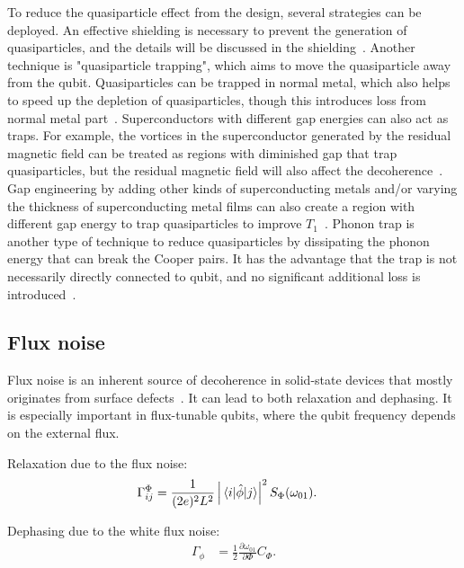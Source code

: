 \documentclass[a4paper,onecolumn,11pt,unpublished]{quantumarticle}
\newcommand{\melabs}[3]{\left|\mel{#1}{#2}{#3}\right|}
\begin{document}
To reduce the quasiparticle effect from the design, several strategies can be deployed. An effective shielding is necessary to prevent the generation of quasiparticles, and the details will be discussed in the shielding~. Another technique is "quasiparticle trapping", which aims to move the quasiparticle away from the qubit. Quasiparticles can be trapped in normal metal, which also helps to speed up the depletion of quasiparticles, though this introduces loss from normal metal part~\cite{Riwar2016Normalmetal}. Superconductors with different gap energies can also act as traps. For example, the vortices in the superconductor generated by the residual magnetic field can be treated as regions with diminished gap that trap quasiparticles, but the residual magnetic field will also affect the decoherence~\cite{Wang2014Measurement}. Gap engineering by adding other kinds of superconducting metals and/or varying the thickness of superconducting metal films can also create a region with different gap energy to trap quasiparticles to improve $T_1$~\cite{Riwar2019Efficient,Pan2022Engineering}. Phonon trap is another type of technique to reduce quasiparticles by dissipating the phonon energy that can break the Cooper pairs. It has the advantage that the trap is not necessarily directly connected to qubit, and no significant additional loss is introduced~\cite{Patel2017Phononmediated,Bargerbos2023Mitigation,Martinis2021Saving,Henriques2019Phonon,deVisser2021PhononTrappingEnhanced}.

\subsection{Flux noise}
Flux noise is an inherent source of decoherence in solid-state devices that mostly originates from surface defects~\cite{Yoshihara2006Decoherence,Koch2007Model,Galperin2007NonGaussian,Kakuyanagi2007Dephasing,Quintana2017Observation,Kumar2016Origin,Wang2018Hydrogen}. It can lead to both relaxation and dephasing. It is especially important in flux-tunable qubits, where the qubit frequency depends on the external flux.  

Relaxation due to the flux noise:~\cite{Nguyen2019HighCoherence,Sun2023Characterization}
\begin{align}
  \Gamma_{ij}^{\Phi} &= \frac{1}{(2e)^2L^2}\melabs{i}{\hat{\phi}}{j}^2S_{\Phi}(\omega_{01}).\label{eq:t1_flux_noise_psd} 
\end{align}

Dephasing due to the white flux noise:
\begin{align}
  \Gamma_{\phi} & = \frac{1}{2}\frac{\partial \omega_{01}}{\partial \Phi}C_{\Phi}. \label{eq:tphi_flux_white_noise_psd}
\end{align}
\end{document}
